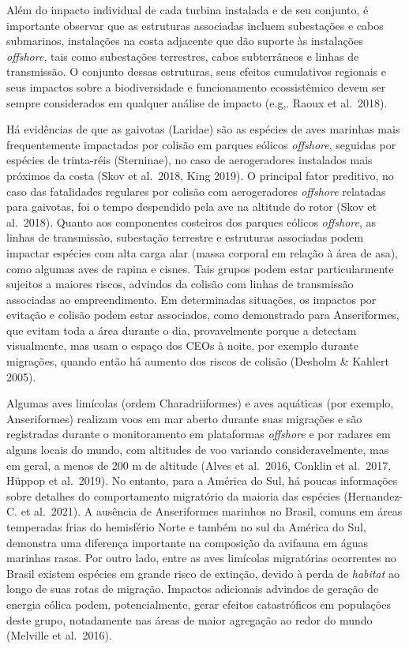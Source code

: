 \documentclass[
  oneside]{scrbook}
\begin{document}
Além do impacto individual de cada turbina instalada e de seu conjunto, é importante observar que as estruturas associadas incluem subestações e cabos submarinos, instalações na costa adjacente que dão suporte às instalações \emph{offshore}, tais como subestações terrestres, cabos subterrâneos e linhas de transmissão. O conjunto dessas estruturas, seus efeitos cumulativos regionais e seus impactos sobre a biodiversidade e funcionamento ecossistêmico devem ser sempre considerados em qualquer análise de impacto (e.g,. Raoux et al.~2018).

Há evidências de que as gaivotas (Laridae) são as espécies de aves marinhas mais frequentemente impactadas por colisão em parques eólicos \emph{offshore}, seguidas por espécies de trinta-réis (Sterninae), no caso de aerogeradores instalados mais próximos da costa (Skov et al.~2018, King 2019). O principal fator preditivo, no caso das fatalidades regulares por colisão com aerogeradores \emph{offshore} relatadas para gaivotas, foi o tempo despendido pela ave na altitude do rotor (Skov et al.~2018). Quanto aos componentes costeiros dos parques eólicos \emph{offshore}, as linhas de transmissão, subestação terrestre e estruturas associadas podem impactar espécies com alta carga alar (massa corporal em relação à área de asa), como algumas aves de rapina e cisnes. Tais grupos podem estar particularmente sujeitos a maiores riscos, advindos da colisão com linhas de transmissão associadas ao empreendimento. Em determinadas situações, os impactos por evitação e colisão podem estar associados, como demonstrado para Anseriformes, que evitam toda a área durante o dia, provavelmente porque a detectam visualmente, mas usam o espaço dos CEOs à noite, por exemplo durante migrações, quando então há aumento dos riscos de colisão (Desholm \& Kahlert 2005).

Algumas aves limícolas (ordem Charadriiformes) e aves aquáticas (por exemplo, Anseriformes) realizam voos em mar aberto durante suas migrações e são registradas durante o monitoramento em plataformas \emph{offshore} e por radares em alguns locais do mundo, com altitudes de voo variando consideravelmente, mas em geral, a menos de 200 m de altitude (Alves et al.~2016, Conklin et al.~2017, Hüppop et al.~2019). No entanto, para a América do Sul, há poucas informações sobre detalhes do comportamento migratório da maioria das espécies (Hernandez-C. et al.~2021). A ausência de Anseriformes marinhos no Brasil, comuns em áreas temperadas frias do hemisfério Norte e também no sul da América do Sul, demonstra uma diferença importante na composição da avifauna em águas marinhas rasas. Por outro lado, entre as aves limícolas migratórias ocorrentes no Brasil existem espécies em grande risco de extinção, devido à perda de \emph{habitat} ao longo de suas rotas de migração. Impactos adicionais advindos de geração de energia eólica podem, potencialmente, gerar efeitos catastróficos em populações deste grupo, notadamente nas áreas de maior agregação ao redor do mundo (Melville et al.~2016).
\end{document}
